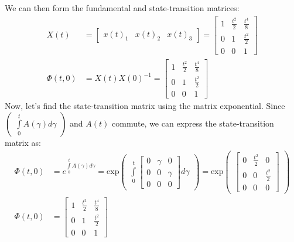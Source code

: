 \documentclass[twoside]{article}
\begin{document}
%
We can then form the fundamental and state-transition matrices:
%
\begin{align*}
	X(t) &= \begin{bmatrix} x(t)_1 & x(t)_2 & x(t)_3 \end{bmatrix}  = \begin{bmatrix} 1 & \frac{t^2}{2} & \frac{t^4}{8} \\ 0 & 1 & \frac{t^2}{2} \\ 0 & 0 & 1 \end{bmatrix} 
	\\
	\Phi(t,0) &= X(t)X(0)^{-1} = \begin{bmatrix} 1 & \frac{t^2}{2} & \frac{t^4}{8} \\ 0 & 1 & \frac{t^2}{2} \\ 0 & 0 & 1 \end{bmatrix} 
\end{align*}
% 
Now, let's find the state-transition matrix using the matrix exponential. Since $\begin{pmatrix} \int\limits_{0}^{t} A(\gamma) d\gamma \end{pmatrix}$ and $A(t)$ commute, we can express the state-transition matrix as:
%
\begin{align*}
	\Phi(t,0) &= e^{ \int\limits_{0}^{t} A(\gamma) d\gamma } 
	= \mathrm{exp} \begin{pmatrix} \int\limits_{0}^{t} \begin{bmatrix} 0 & \gamma & 0 \\ 0 & 0 & \gamma \\ 0 & 0 & 0 \end{bmatrix} d\gamma \end{pmatrix}	
	= \mathrm{exp} \begin{pmatrix} \begin{bmatrix} 0 & \frac{t^2}{2} & 0 \\ 0 & 0 & \frac{t^2}{2} \\ 0 & 0 & 0 \end{bmatrix} \end{pmatrix}	
	\\
	\Phi(t,0) &= \begin{bmatrix} 1 & \frac{t^2}{2} & \frac{t^4}{8} \\ 0 & 1 & \frac{t^2}{2} \\ 0 & 0 & 1 \end{bmatrix} 
\end{align*}
\end{document}
